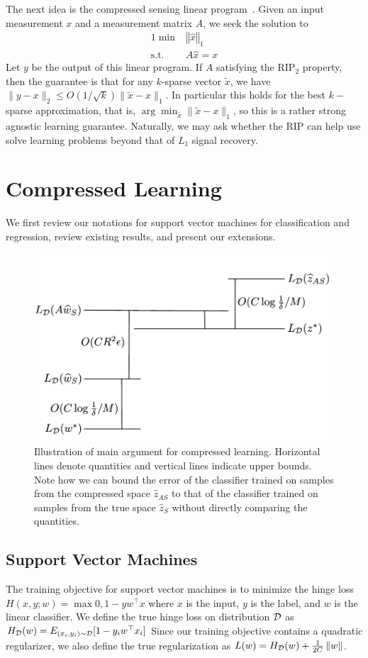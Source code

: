 \documentclass[english]{article}
\theoremstyle{plain}
\DeclareMathOperator{\st}{s.t.}
\begin{document}
The next idea is the compressed sensing linear program~\citep{Candes2006}.
Given an input measurement $x$ and a measurement matrix $A$, we seek the solution to
\begin{alignat*}{1}
\min & \left\Vert \widehat{x}\right\Vert _{1}\\
\st & A\widehat{x}=x
\end{alignat*}
Let $y$ be the output of this linear program.
If $A$ satisfying the RIP$_2$ property, then the guarantee is that for any $k$-sparse vector $\tilde{x}$, we have $\|y - x\|_2 \le O(1/\sqrt{k}) \|\tilde{x}-x\|_1$.
In particular this holds for the best $k-$sparse approximation, that is, $\arg\min_{\tilde{x}} \|\tilde{x}-x\|_1$, so this is a rather strong agnostic learning guarantee.
Naturally, we may ask whether the RIP can help use solve learning problems beyond that of $L_1$ signal recovery.

\section{Compressed Learning}
We first review our notations for support vector machines for classification and regression, review existing results, and present our extensions.

\begin{figure}
    \centering
    \includegraphics[width=0.6\columnwidth]{bounds_argument_figure.pdf}
    \caption{
Illustration of main argument for compressed learning.
Horizontal lines denote quantities and vertical lines indicate upper bounds.
Note how we can bound the error of the classifier trained on samples from the compressed space $\widehat{z}_{AS}$ to that of the classifier trained on samples from the true space $\widehat{z}_S$ without directly comparing the quantities.
}
    \label{fig:bounds_argument} 

\end{figure}
\subsection{Support Vector Machines}
The training objective for support vector machines is to minimize the hinge loss $H(x,y;w) = \max{0, 1 - yw^\top x}$ where $x$ is the input, $y$ is the label, and $w$ is the linear classifier.
We define the true hinge loss on distribution $\cal D$ as $H_{\cal D}(w) = E_{(x_i,y_i) \sim {\cal D}} [1 - y_i w^\top x_i]$
Since our training objective contains a quadratic regularizer, we also define the true regularization as $L(w) = H_{\cal D}(w) + \frac{1}{2C}\left\Vert w \right\Vert$.
\end{document}
